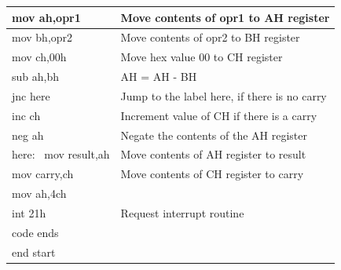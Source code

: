 \documentclass[12pt,a4paper]{article}
\begin{document}
\begin{flushleft}
\begin{table}[htb]
{\begin{tabular}{|l|l|}
\hline
mov ah,opr1                                                      & Move contents of opr1 to AH register          \\ 
\hline
mov bh,opr2                                                      & Move contents of opr2 to BH register          \\ 
\hline
mov ch,00h                                                       & Move hex value 00 to CH register              \\ 
\hline
sub ah,bh                                                        & AH = AH - BH                                  \\ 
\hline
jnc here                                                         & Jump to the label here, if there is no carry  \\ 
\hline
inc ch                                                           & Increment value of CH if there is a carry     \\ 
\hline
neg ah                                                           & Negate the contents of the AH register        \\
\hline
here:~ mov result,ah                                             & Move contents of AH register to result        \\ 
\hline
mov carry,ch                                                     & Move contents of CH register to carry         \\ 
\hline
mov ah,4ch                                                       &                                               \\ 
\hline
int 21h                                                          & Request interrupt routine                     \\ 
\hline
code ends                                                        &                                               \\ 
\hline
end start                                                        &                                               \\
\hline
\end{tabular}
}
\end{table}


\end{flushleft}
\end{document}
